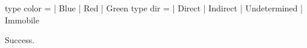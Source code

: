 \chklistingtrue
{}
\begin{ChkListingMsg}
type color   =  | Blue  | Red  | Green
type dir   =  | Direct  | Indirect  | Undetermined  | Immobile
\end{ChkListingMsg}
\begin{ChkListingErr}
Success.
\end{ChkListingErr}
